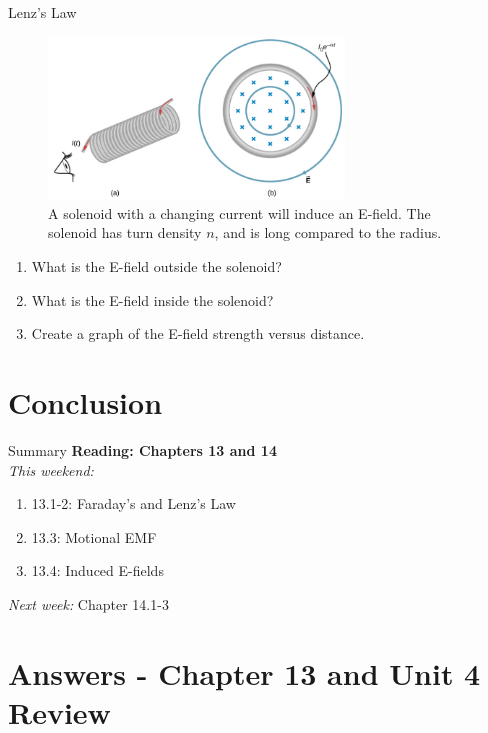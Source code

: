 \documentclass{beamer}
\begin{document}
\begin{frame}{Lenz's Law}
\small
\begin{figure}
\centering
\includegraphics[width=0.7\textwidth]{figures/loop3.png}
\caption{\label{fig:loop5} A solenoid with a changing current will induce an E-field.  The solenoid has turn density $n$, and is long compared to the radius.}
\end{figure}
\begin{enumerate}
\item What is the E-field outside the solenoid?
\item What is the E-field inside the solenoid?
\item Create a graph of the E-field strength versus distance.
\end{enumerate}
\end{frame}

\section{Conclusion}

\begin{frame}{Summary}
\textbf{Reading: Chapters 13 and 14} \\ \vspace{0.5cm}
\textit{This weekend:}
\begin{enumerate}
\item 13.1-2: Faraday's and Lenz's Law
\item 13.3: Motional EMF
\item 13.4: Induced E-fields
\end{enumerate}
\textit{Next week:} Chapter 14.1-3
\end{frame}

\section{Answers - Chapter 13 and Unit 4 Review}
\end{document}
